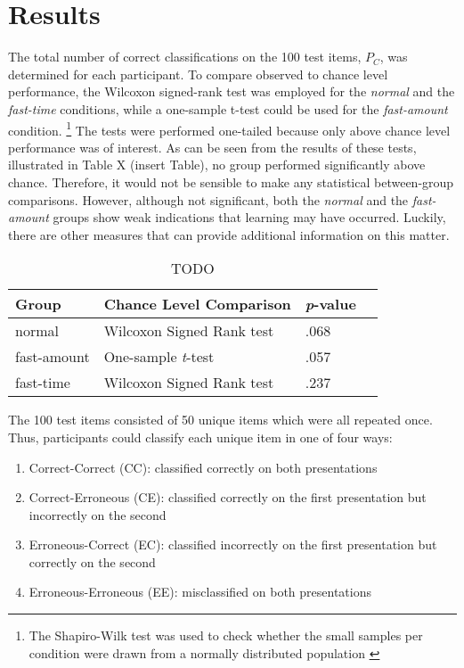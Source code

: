 \section{Results}
The total number of correct classifications on the 100 test items, $P_{C}$, was determined for each participant. To compare observed to chance level performance, the Wilcoxon signed-rank test was employed for the \textit{normal} and the \textit{fast-time} conditions, while a one-sample t-test could be used for the \textit{fast-amount} condition. \footnote{The Shapiro-Wilk test was used to check whether the small samples per condition were drawn from a normally distributed population \citep{yazici2007comparison}} The tests were performed one-tailed because only above chance level performance was of interest. As can be seen from the results of these tests, illustrated in Table X (insert Table), no group performed significantly above chance. Therefore, it would not be sensible to make any statistical between-group comparisons. However, although not significant, both the \textit{normal} and the \textit{fast-amount} groups show weak indications that learning may have occurred. Luckily, there are other measures that can provide additional information on this matter.
\begin{table}[h]
\centering
\begin{tabular}{l l l l }
\toprule
\textbf{Group} & \textbf{Chance Level Comparison} & \textbf{\textit{p}-value} \\
\midrule
  normal      & Wilcoxon Signed Rank test        & .068 \\
  fast-amount & One-sample \textit{t}-test       & .057 \\
  fast-time   & Wilcoxon Signed Rank test        & .237 \\      
\bottomrule
\end{tabular}
\caption{TODO}
\end{table}
The 100 test items consisted of 50 unique items which were all repeated once. Thus, participants could classify each unique item in one of four ways:
\begin{enumerate}
\item Correct-Correct (CC): classified correctly on both presentations
\item Correct-Erroneous (CE): classified correctly on the first presentation but incorrectly on the second
\item Erroneous-Correct (EC): classified incorrectly on the first presentation but correctly on the second
\item Erroneous-Erroneous (EE): misclassified on both presentations
\end{enumerate}
